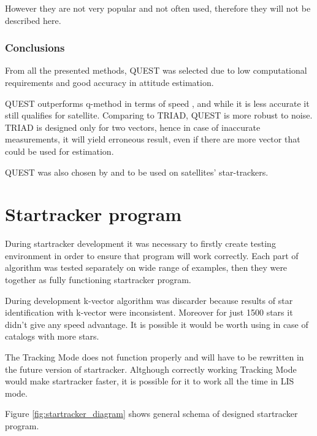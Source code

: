 \documentclass[12pt,a4paper,oneside]{article}
\begin{document}
However they are not very popular and not often used, therefore they will not be described here.

\subsubsection{Conclusions}


From all the presented methods, QUEST was selected due to low computational requirements and good accuracy in attitude estimation.

QUEST outperforms q-method in terms of speed \cite{markley1999estimate}, and while it is less accurate it still qualifies for satellite. Comparing to TRIAD, QUEST is more robust to noise. TRIAD is designed only for two vectors, hence in case of inaccurate measurements, it will yield erroneous result, even if there are more vector that could be used for estimation.

QUEST was also chosen by \citet{huffman2006designing} and \citet{tappe2009development} to be used on satellites' star-trackers.

\newpage
\section{Startracker program}

During startracker development it was necessary to firstly create testing environment in order to ensure that program will work correctly. Each part of algorithm was tested separately on wide range of examples, then they were together as fully functioning startracker program.

During development k-vector algorithm was discarder because results of star identification with k-vector were inconsistent. Moreover for just 1500 stars it didn't give any speed advantage. It is possible it would be worth using in case of catalogs with more stars.

The Tracking Mode does not function properly and will have to be rewritten in the future version of startracker. Altghough correctly working Tracking Mode would make startracker faster, it is possible for it to work all the time in LIS mode.

Figure \ref{fig:startracker_diagram} shows general schema of designed startracker program.
\end{document}
